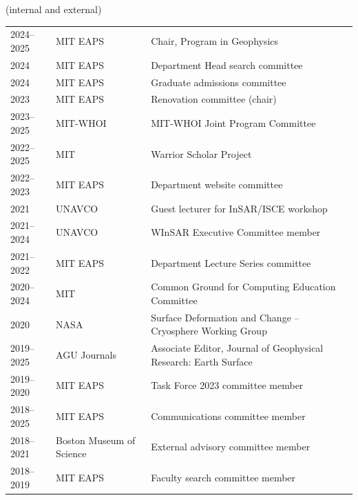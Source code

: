 \documentclass[11pt, oneside]{article}
\newcommand{\cvsection}[1]{%
  \vspace{4mm}%
  \noindent{\large\sffamily\bfseries\color{DeepTeal}#1}%
  \vspace{1mm}%
  \par\noindent{\color{CaltechOrange}\rule{\textwidth}{0.8pt}}%
  \vspace{2mm}%
}
\begin{document}
\cvsection{Academic Service}
{\small\color{CoolGray}(internal and external)}
\vspace{-2mm}
\begin{longtable}[h]{l l p{10.5cm}}
2024--2025 & MIT EAPS & Chair, Program in Geophysics \\
2024   & MIT EAPS & Department Head search committee \\
2024   & MIT EAPS & Graduate admissions committee \\
2023   & MIT EAPS & Renovation committee (chair) \\
2023--2025 & MIT-WHOI & MIT-WHOI Joint Program Committee \\
2022--2025 & MIT & Warrior Scholar Project \\
2022--2023  & MIT EAPS & Department website committee \\
2021    & UNAVCO & Guest lecturer for InSAR/ISCE workshop \\
2021--2024 & UNAVCO & WInSAR Executive Committee member \\
2021--2022 & MIT EAPS & Department Lecture Series committee \\
2020--2024 & MIT & Common Ground for Computing Education Committee \\
2020 & NASA & Surface Deformation and Change -- Cryosphere Working Group \\
2019--2025 & AGU Journals & Associate Editor, Journal of Geophysical Research: Earth Surface \\
2019--2020 & MIT EAPS  & Task Force 2023 committee member \\
2018--2025 & MIT EAPS & Communications committee member \\
2018--2021 & Boston Museum of Science & External advisory committee member \\
2018--2019 & MIT EAPS & Faculty search committee member
\end{longtable}
\vspace{-5mm}
\end{document}

